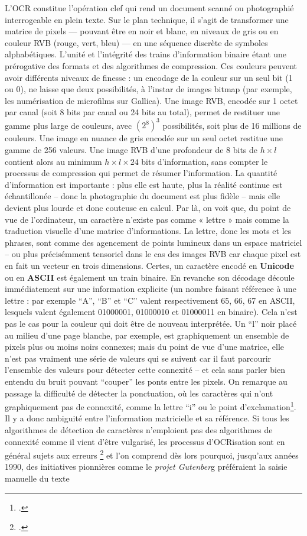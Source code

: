 L’OCR constitue l’opération clef qui rend un document scanné ou photographié interrogeable en plein texte. Sur le plan technique, il s’agit de transformer une matrice de pixels — pouvant être en noir et blanc, en niveaux de gris ou en couleur RVB (rouge, vert, bleu) — en une séquence discrète de symboles alphabétiques. L'unité et l'intégrité des trains d'information binaire étant une prérogative des formats et des algorithmes de compression. Ces couleurs peuvent avoir différents niveaux de finesse : un encodage de la couleur sur un seul bit (1 ou 0), ne laisse que deux possibilités, à l'instar de images bitmap (par exemple, les numérisation de microfilms sur Gallica). Une image RVB, encodée sur 1 octet par canal (soit 8 bits par canal ou 24 bits au total), permet de restituer une gamme plus large de couleurs, avec $(2^8)^3$ possibilités, soit plus de 16 millions de couleurs. Une image en nuance de gris encodée sur un seul octet restitue une gamme de 256 valeurs. Une image RVB d'une profondeur de 8 bits de $h \times l$ contient alors au minimum $h \times l \times 24$ bits d'information, sans compter le processus de compression qui permet de résumer l'information. La quantité d'information est importante : plus elle est haute, plus la réalité continue est échantillonée -- donc la photographie du document est plus fidèle -- mais elle devient plus lourde et donc couteuse en calcul. Par là, on voit que, du point de vue de l’ordinateur, un caractère n’existe pas comme « lettre » mais comme la traduction visuelle d'une matrice d'informations. La lettre, donc les mots et les phrases, sont comme des agencement de points lumineux dans un espace matriciel -- ou plus précisémment tensoriel dans le cas des images RVB car chaque pixel est en fait un vecteur en trois dimensions. Certes, un caractère encodé en \textbf{Unicode} ou en \textbf{ASCII} est également un train binaire. En revanche son décodage découle immédiatement sur une information explicite (un nombre faisant référence à une lettre : par exemple \enquote{A}, \enquote{B} et \enquote{C} valent respectivement 65, 66, 67 en ASCII, lesquels valent également 01000001, 01000010 et 01000011 en binaire). Cela n'est pas le cas pour la couleur qui doit être de nouveau interprétée. Un \enquote{l} noir placé au milieu d'une page blanche, par exemple, est graphiquement un ensemble de pixels plus ou moins noirs connexes; mais du point de vue d'une matrice, elle n'est pas vraiment une série de valeurs qui se suivent car il faut parcourir l'ensemble des valeurs pour détecter cette connexité -- et cela sans parler bien entendu du bruit pouvant \enquote{couper} les ponts entre les pixels. On remarque au passage la difficulté de détecter la ponctuation, où les caractères qui n'ont graphiquement pas de connexité, comme la lettre \enquote{i} ou le point d'exclamation\footcite[][]{lecolinet}. Il y a donc ambiguité entre l'information matricielle et sa référence. Si tous les algorithmes de détection de caractères n'emploient pas des algorithmes de connexité comme il vient d'être vulgarisé, les processus d'OCRisation sont en général sujets aux erreurs \footcite[][]{chiron} et l’on comprend dès lors pourquoi, jusqu’aux années 1990, des initiatives pionnières comme le \emph{projet Gutenber}g préféraient la saisie manuelle du texte 